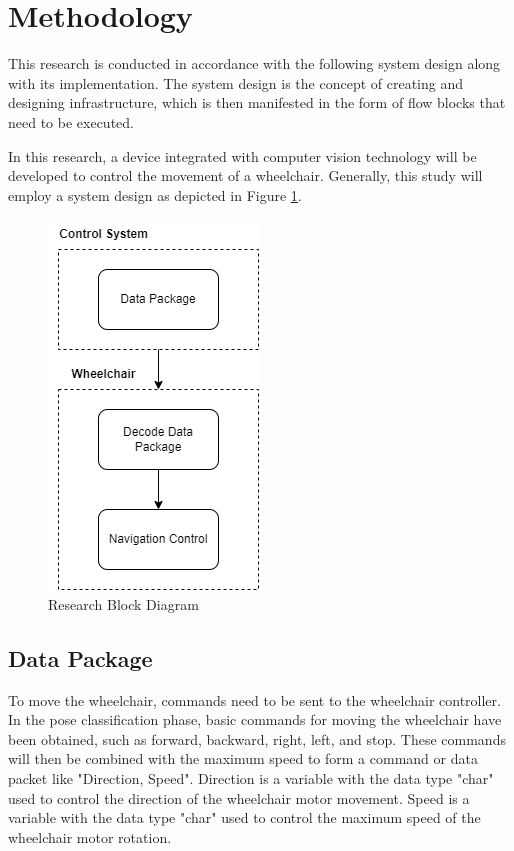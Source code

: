 \section{Methodology}
\label{sec:metodologi}

This research is conducted in accordance with the following system design along with its implementation. The system design is the concept of creating and designing infrastructure, which is then manifested in the form of flow blocks that need to be executed.

In this research, a device integrated with computer vision technology will be developed to control the movement of a wheelchair. Generally, this study will employ a system design as depicted in Figure \ref{fig:Metodologi Penelitian}.

\begin{figure} [ht] \centering
    \includegraphics[scale=0.8]{gambar/block diagram.png}
    \caption{Research Block Diagram}
    \label{fig:Metodologi Penelitian}
\end{figure}

\subsection{Data Package}
To move the wheelchair, commands need to be sent to the wheelchair controller. In the pose classification phase, basic commands for moving the wheelchair have been obtained, such as forward, backward, right, left, and stop. These commands will then be combined with the maximum speed to form a command or data packet like "Direction, Speed". Direction is a variable with the data type "char" used to control the direction of the wheelchair motor movement. Speed is a variable with the data type "char" used to control the maximum speed of the wheelchair motor rotation.

